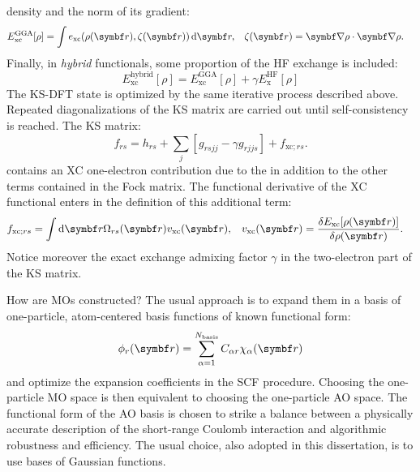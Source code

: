 density and the norm of its gradient:
\begin{alignat}{2}
 E^\mathrm{GGA}_\mathrm{xc}[\rho] = \int
 e_\mathrm{xc}(\rho(\vect{r}),\zeta(\vect{r}))\diff\vect{r},
 \quad&
 \zeta(\vect{r}) = \vect{\nabla}\rho\cdot \vect{\nabla}\rho.
\end{alignat}
Finally, in \emph{hybrid} functionals, some proportion of the
\acrshort{HF} exchange is included:
\begin{equation}
 E^\mathrm{hybrid}_\mathrm{xc}[\rho] = E^\mathrm{GGA}_\mathrm{xc}[\rho] + \gamma E^\mathrm{HF}_\mathrm{x}[\rho]
\end{equation}
The \acrshort{KS}-\acrshort{DFT} state is optimized by the same
iterative process described above.
Repeated diagonalizations of the \acrshort{KS} matrix are carried out
until self-consistency is reached.
The \acrshort{KS} matrix:
\begin{equation}\label{eq:ksmatrix}
  f_{rs} = h_{rs} + \sum_{j}[g_{rsjj} - \gamma g_{rjjs}] + f_{\mathrm{xc};rs}.
\end{equation}
contains an \acrshort{XC} one-electron contribution due to the
in addition to the other terms contained in the Fock matrix.
The functional derivative of the \acrshort*{XC} functional enters in the
definition of this additional term:
\begin{alignat}{2}
  f_{\mathrm{xc}; rs}
  =
  \int\diff\vect{r}\Omega_{rs}(\vect{r})v_\mathrm{xc}(\vect{r}),
  \quad&
  v_\mathrm{xc}(\vect{r})
  =
  \frac{\delta E_\mathrm{xc}[\rho(\vect{r})]}{\delta \rho(\vect{r})}.
\end{alignat}
Notice moreover the exact exchange admixing factor $\gamma$ in the
two-electron part of the \acrshort*{KS} matrix.

How are \glspl*{MO} constructed? The usual approach is to expand them in
a basis of one-particle, atom-centered basis functions of known
functional form:
\begin{equation}
  \phi_r(\vect{r})
  =
  \sum_{\alpha=1}^{N_\mathrm{basis}}
  C_{\alpha r}\chi_{\alpha}(\vect{r})
\end{equation}
and optimize the expansion coefficients in the \acrshort*{SCF} procedure.
Choosing the one-particle \acrshort*{MO} space is then equivalent to
choosing the one-particle \gls{AO} space.
The functional form of the \acrshort*{AO} basis is chosen to strike a
balance between a physically accurate description of the short-range
Coulomb interaction and algorithmic robustness and
efficiency.\autocite{Helgaker2000-tz}
The usual choice, also adopted in this dissertation, is to use bases of
Gaussian functions.\autocite{Helgaker1995-gi, Reine2012-tq}

